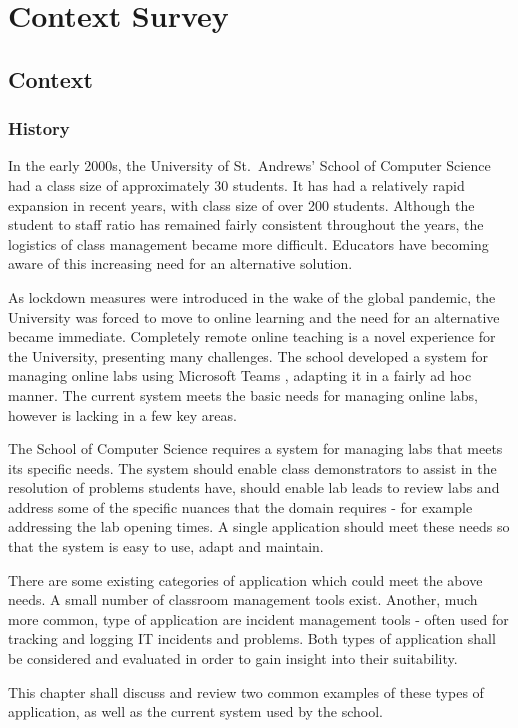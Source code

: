 \chapter{Context Survey}
\section{Context}
\subsection{History}

In the early 2000s, the University of St.\ Andrews' School of Computer Science had a class size of approximately 30 students. It has had a relatively rapid expansion in recent years, with class size of over 200 students. Although the student to staff ratio has remained fairly consistent throughout the years, the logistics of class management became more difficult. Educators have becoming aware of this increasing need for an alternative solution.

As lockdown measures were introduced in the wake of the global pandemic, the University was forced to move to online learning and the need for an alternative became immediate. Completely remote online teaching is a novel experience for the University, presenting many challenges. The school developed a system for managing online labs using Microsoft Teams \cite{teams}, adapting it in a fairly ad hoc manner. The current system meets the basic needs for managing online labs, however is lacking in a few key areas.

The School of Computer Science requires a system for managing labs that meets its specific needs. The system should enable class demonstrators to assist in the resolution of problems students have, should enable lab leads to review labs and address some of the specific nuances that the domain requires - for example addressing the lab opening times. A single application should meet these needs so that the system is easy to use, adapt and maintain.

There are some existing categories of application which could meet the above needs. A small number of classroom management tools exist. Another, much more common, type of application are incident management tools - often used for tracking and logging IT incidents and problems. Both types of application shall be considered and evaluated in order to gain insight into their suitability.
 
This chapter shall discuss and review two common examples of these types of application, as well as the current system used by the school.

